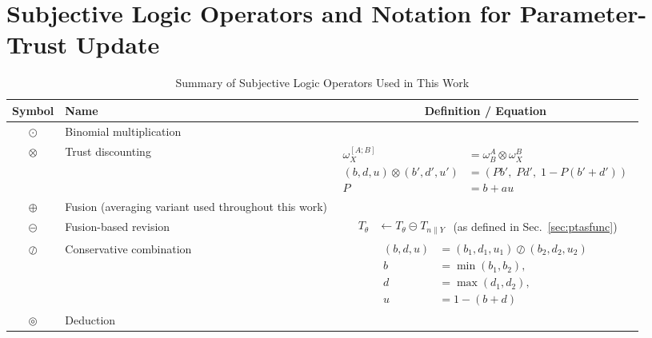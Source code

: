\section{Subjective Logic Operators and Notation for Parameter-Trust Update}\label{app:operator}
\begin{table}[H]
\centering
\caption{Summary of Subjective Logic Operators Used in This Work}
\label{tab:operators}
\renewcommand{\arraystretch}{1.3}
\begin{tabular}{|c|l|c|}
\hline
\textbf{Symbol} & \textbf{Name} & \textbf{Definition / Equation} \\ \hline

$\odot$ & Binomial multiplication &
\cite{josang2016subjective} \\ \hline

$\otimes$ & Trust discounting &
$\begin{aligned}
\omega^{[A;B]}_{X} &= \omega^A_B \otimes \omega^B_X \\
(b,d,u) \otimes (b',d',u') &= \left(Pb',\; Pd',\; 1-P\left(b'+d'\right)\right)\\
P &= b+au 
\end{aligned}$ \\ \hline

$\oplus$ & Fusion (averaging variant used throughout this work) &
\cite{8009820}\\ \hline

$\circleddash$ & Fusion-based revision &
$\begin{aligned}
T_{\theta} &\leftarrow T_{\theta} \circleddash T_{n \parallel Y}
\end{aligned}$ 
(as defined in Sec.~\ref{sec:ptasfunc}) \\ \hline

$\oslash$ & Conservative combination &
$\begin{aligned}
(b,d,u) &= (b_1,d_1,u_1) \oslash (b_2,d_2,u_2) \\
b &= \min(b_1,b_2), \\
d &= \max(d_1,d_2), \\
u &= 1-(b+d)
\end{aligned}$ \\ \hline

$\circledcirc $ & Deduction &
\cite{7528033,josang2016subjective}  \\ \hline

\end{tabular}
\end{table}

